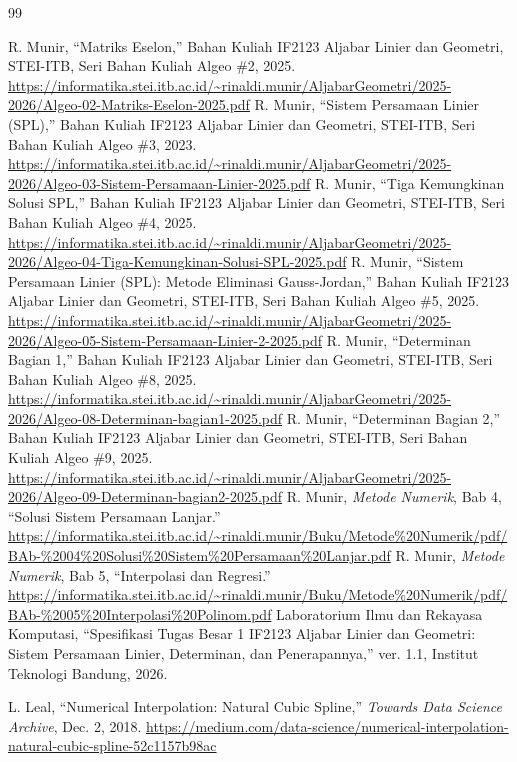 \documentclass[12pt,a4paper]{report}
\begin{document}
\begin{thebibliography}{99}

R. Munir, ``Matriks Eselon,'' Bahan Kuliah IF2123 Aljabar Linier dan Geometri, STEI-ITB, Seri Bahan Kuliah Algeo \#2, 2025.
\url{https://informatika.stei.itb.ac.id/~rinaldi.munir/AljabarGeometri/2025-2026/Algeo-02-Matriks-Eselon-2025.pdf}
R. Munir, ``Sistem Persamaan Linier (SPL),'' Bahan Kuliah IF2123 Aljabar Linier dan Geometri, STEI-ITB, Seri Bahan Kuliah Algeo \#3, 2023.
\url{https://informatika.stei.itb.ac.id/~rinaldi.munir/AljabarGeometri/2025-2026/Algeo-03-Sistem-Persamaan-Linier-2025.pdf}
R. Munir, ``Tiga Kemungkinan Solusi SPL,'' Bahan Kuliah IF2123 Aljabar Linier dan Geometri, STEI-ITB, Seri Bahan Kuliah Algeo \#4, 2025.
\url{https://informatika.stei.itb.ac.id/~rinaldi.munir/AljabarGeometri/2025-2026/Algeo-04-Tiga-Kemungkinan-Solusi-SPL-2025.pdf}
R. Munir, ``Sistem Persamaan Linier (SPL): Metode Eliminasi Gauss-Jordan,'' Bahan Kuliah IF2123 Aljabar Linier dan Geometri, STEI-ITB, Seri Bahan Kuliah Algeo \#5, 2025.
\url{https://informatika.stei.itb.ac.id/~rinaldi.munir/AljabarGeometri/2025-2026/Algeo-05-Sistem-Persamaan-Linier-2-2025.pdf}
R. Munir, ``Determinan Bagian 1,'' Bahan Kuliah IF2123 Aljabar Linier dan Geometri, STEI-ITB, Seri Bahan Kuliah Algeo \#8, 2025.
\url{https://informatika.stei.itb.ac.id/~rinaldi.munir/AljabarGeometri/2025-2026/Algeo-08-Determinan-bagian1-2025.pdf}
R. Munir, ``Determinan Bagian 2,'' Bahan Kuliah IF2123 Aljabar Linier dan Geometri, STEI-ITB, Seri Bahan Kuliah Algeo \#9, 2025.
\url{https://informatika.stei.itb.ac.id/~rinaldi.munir/AljabarGeometri/2025-2026/Algeo-09-Determinan-bagian2-2025.pdf}
R. Munir, \textit{Metode Numerik}, Bab 4, ``Solusi Sistem Persamaan Lanjar.''
\url{https://informatika.stei.itb.ac.id/~rinaldi.munir/Buku/Metode\%20Numerik/pdf/BAb-\%2004\%20Solusi\%20Sistem\%20Persamaan\%20Lanjar.pdf}
R. Munir, \textit{Metode Numerik}, Bab 5, ``Interpolasi dan Regresi.''
\url{https://informatika.stei.itb.ac.id/~rinaldi.munir/Buku/Metode\%20Numerik/pdf/BAb-\%2005\%20Interpolasi\%20Polinom.pdf}
Laboratorium Ilmu dan Rekayasa Komputasi, ``Spesifikasi Tugas Besar 1 IF2123 Aljabar Linier dan Geometri: Sistem Persamaan Linier, Determinan, dan Penerapannya,'' ver. 1.1, Institut Teknologi Bandung, 2026.


L. Leal, ``Numerical Interpolation: Natural Cubic Spline,'' \textit{Towards Data Science Archive}, Dec. 2, 2018.
\url{https://medium.com/data-science/numerical-interpolation-natural-cubic-spline-52c1157b98ac}


\end{thebibliography}
\end{document}
